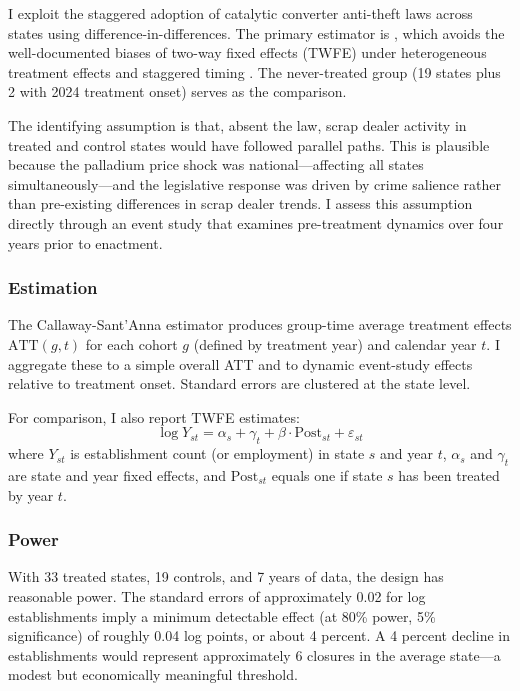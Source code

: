 \documentclass[12pt]{article}
\begin{document}
I exploit the staggered adoption of catalytic converter anti-theft laws across states using difference-in-differences. The primary estimator is \citet{callaway2021}, which avoids the well-documented biases of two-way fixed effects (TWFE) under heterogeneous treatment effects and staggered timing \citep{goodman2021, sun2021, borusyak2024}. The never-treated group (19 states plus 2 with 2024 treatment onset) serves as the comparison.

The identifying assumption is that, absent the law, scrap dealer activity in treated and control states would have followed parallel paths. This is plausible because the palladium price shock was national---affecting all states simultaneously---and the legislative response was driven by crime salience rather than pre-existing differences in scrap dealer trends. I assess this assumption directly through an event study that examines pre-treatment dynamics over four years prior to enactment.

\subsubsection*{Estimation} The Callaway-Sant'Anna estimator produces group-time average treatment effects $\text{ATT}(g,t)$ for each cohort $g$ (defined by treatment year) and calendar year $t$. I aggregate these to a simple overall ATT and to dynamic event-study effects relative to treatment onset. Standard errors are clustered at the state level.

For comparison, I also report TWFE estimates:
\begin{equation}
\log Y_{st} = \alpha_s + \gamma_t + \beta \cdot \text{Post}_{st} + \varepsilon_{st}
\end{equation}
where $Y_{st}$ is establishment count (or employment) in state $s$ and year $t$, $\alpha_s$ and $\gamma_t$ are state and year fixed effects, and $\text{Post}_{st}$ equals one if state $s$ has been treated by year $t$.

\subsubsection*{Power} With 33 treated states, 19 controls, and 7 years of data, the design has reasonable power. The standard errors of approximately 0.02 for log establishments imply a minimum detectable effect (at 80\% power, 5\% significance) of roughly 0.04 log points, or about 4 percent. A 4 percent decline in establishments would represent approximately 6 closures in the average state---a modest but economically meaningful threshold.
\end{document}
